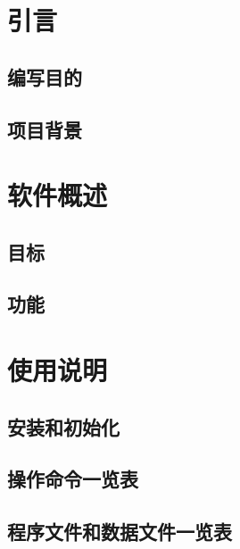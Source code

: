 \section{引言}
	\subsection{编写目的}
	\subsection{项目背景}
\section{软件概述}
	\subsection{目标}
	\subsection{功能}
\section{使用说明}
	\subsection{安装和初始化}
	\subsection{操作命令一览表}
	\subsection{程序文件和数据文件一览表}